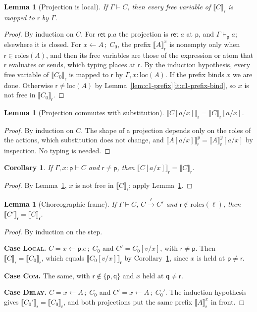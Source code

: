 \documentclass[11pt]{report}
\theoremstyle{plain}
\newtheorem{lemma}[theorem]{Lemma}
\newtheorem{corollary}[theorem]{Corollary}
\theoremstyle{definition}
\theoremstyle{remark}
\newcommand{\kw}[1]{\mathsf{#1}}
\newcommand{\pp}{\mathsf{p}}
\newcommand{\qq}{\mathsf{q}}
\newcommand{\rr}{\mathsf{r}}
\newcommand{\bind}[3]{#1 \leftarrow #2\,;\;#3}
\newcommand{\cret}[1]{\kw{ret}\;#1}
\newcommand{\roles}[1]{\mathrm{roles}(#1)}
\newcommand{\loc}[1]{\mathrm{loc}(#1)}
\newcommand{\lto}[1]{\xrightarrow{\;#1\;}}
\newcommand{\proj}[2]{\llbracket #1 \rrbracket_{#2}}
\newcommand{\pre}[3]{\llbracket #1 \rrbracket^{#2}_{#3}}
\newcommand{\rn}[1]{{\normalfont\scshape #1}}
\newcommand{\case}[1]{\medskip\noindent\textbf{Case #1.}\;}
\begin{document}
\begin{lemma}[Projection is local]\label{lem:c1-local}
  If $\Gamma\vdash C$, then every free variable of $\proj{C}{\rr}$ is mapped to
  $\rr$ by $\Gamma$.
\end{lemma}
\begin{proof}
  By induction on $C$.  For $\cret{\pp.a}$ the projection is $\kw{ret}\;a$ at
  $\pp$, and $\Gamma\vdash_\pp a$; elsewhere it is closed.  For
  $\bind{x}{A}{C_0}$, the prefix $\pre{A}{x}{\rr}$ is nonempty only when
  $\rr\in\roles{A}$, and then its free variables are those of the expression
  or atom that $\rr$ evaluates or sends, which typing places at $\rr$.  By the
  induction hypothesis, every free variable of $\proj{C_0}{\rr}$ is mapped to
  $\rr$ by $\Gamma,x{:}\loc{A}$.  If the prefix binds $x$ we are done.
  Otherwise $\rr\neq\loc{A}$ by Lemma~\ref{lem:c1-prefix}\ref{it:c1-prefix-bind},
  so $x$ is not free in $\proj{C_0}{\rr}$.
\end{proof}

\begin{lemma}[Projection commutes with substitution]\label{lem:c1-psubst}
  $\proj{C[a/x]}{\rr} = \proj{C}{\rr}[a/x]$.
\end{lemma}
\begin{proof}
  By induction on $C$.  The shape of a projection depends only on the roles
  of the actions, which substitution does not change, and
  $\pre{A[a/x]}{y}{\rr} = \pre{A}{y}{\rr}[a/x]$ by inspection.  No typing is
  needed.
\end{proof}

\begin{corollary}\label{cor:c1-psubst}
  If $\Gamma,x{:}\pp\vdash C$ and $\rr\neq\pp$, then
  $\proj{C[a/x]}{\rr}=\proj{C}{\rr}$.
\end{corollary}
\begin{proof}
  By Lemma~\ref{lem:c1-local}, $x$ is not free in $\proj{C}{\rr}$; apply
  Lemma~\ref{lem:c1-psubst}.
\end{proof}

\begin{lemma}[Choreographic frame]\label{lem:c1-cframe}
  If $\Gamma\vdash C$, $C\lto{\ell}C'$ and $\rr\notin\roles{\ell}$, then
  $\proj{C'}{\rr}=\proj{C}{\rr}$.
\end{lemma}
\begin{proof}
  By induction on the step.

  \case{\rn{Local}}
  $C=\bind{x}{\pp.e}{C_0}$ and $C'=C_0[v/x]$, with $\rr\neq\pp$.  Then
  $\proj{C}{\rr}=\proj{C_0}{\rr}$, which equals $\proj{C_0[v/x]}{\rr}$ by
  Corollary~\ref{cor:c1-psubst}, since $x$ is held at $\pp\neq\rr$.

  \case{\rn{Com}}
  The same, with $\rr\notin\{\pp,\qq\}$ and $x$ held at $\qq\neq\rr$.

  \case{\rn{Delay}}
  $C=\bind{x}{A}{C_0}$ and $C'=\bind{x}{A}{C_0'}$.  The induction hypothesis
  gives $\proj{C_0'}{\rr}=\proj{C_0}{\rr}$, and both projections put the same
  prefix $\pre{A}{x}{\rr}$ in front.
\end{proof}
\end{document}
